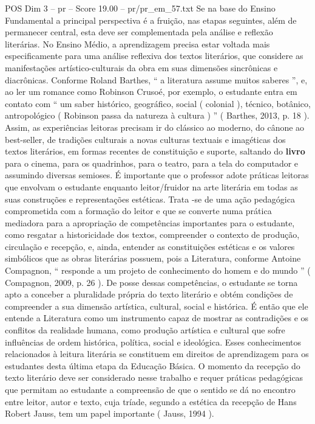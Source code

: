 \begin{textsample}{POS Dim 3 – pr – Score 19.00 – pr/pr\_em\_57.txt}
Se na base do Ensino Fundamental a principal perspectiva é a fruição, nas etapas seguintes, além de permanecer central, esta deve ser complementada pela análise e reflexão literárias.
No Ensino Médio, a aprendizagem precisa estar voltada mais especificamente para uma análise reflexiva dos textos literários, que considere as manifestações artístico-culturais da obra em suas dimensões sincrônicas e diacrônicas.
Conforme Roland Barthes, “ a literatura assume muitos saberes ”, e, ao ler um romance como Robinson Crusoé, por exemplo, o estudante entra em contato com “ um saber histórico, geográfico, social ( colonial ), técnico, botânico, antropológico ( Robinson passa da natureza à cultura ) ” ( Barthes, 2013, p. 18 ).
Assim, as experiências leitoras precisam ir do clássico ao moderno, do cânone ao best-seller, de tradições culturais a novas culturas textuais e imagéticas dos textos literários, em formas recentes de constituição e suporte, saltando do \textbf{livro} para o cinema, para os quadrinhos, para o teatro, para a tela do computador e assumindo diversas semioses.
É importante que o professor adote práticas leitoras que envolvam o estudante enquanto leitor/fruidor na arte literária em todas as suas construções e representações estéticas.
Trata -se de uma ação pedagógica comprometida com a formação do leitor e que se converte numa prática mediadora para a apropriação de competências importantes para o estudante, como resgatar a historicidade dos textos, compreender o contexto de produção, circulação e recepção, e, ainda, entender as constituições estéticas e os valores simbólicos que as obras literárias possuem, pois a Literatura, conforme Antoine Compagnon, “ responde a um projeto de conhecimento do homem e do mundo ” ( Compagnon, 2009, p. 26 ).
De posse dessas competências, o estudante se torna apto a conceber a pluralidade própria do texto literário e obtém condições de compreender a sua dimensão artística, cultural, social e histórica.
É então que ele entende a Literatura como um instrumento capaz de mostrar as contradições e os conflitos da realidade humana, como produção artística e cultural que sofre influências de ordem histórica, política, social e ideológica.
Esses conhecimentos relacionados à leitura literária se constituem em direitos de aprendizagem para os estudantes desta última etapa da Educação Básica.
O momento da recepção do texto literário deve ser considerado nesse trabalho e requer práticas pedagógicas que permitam ao estudante a compreensão de que o sentido se dá no encontro entre leitor, autor e texto, cuja tríade, segundo a estética da recepção de Hans Robert Jauss, tem um papel importante ( Jauss, 1994 ).

\end{textsample}
